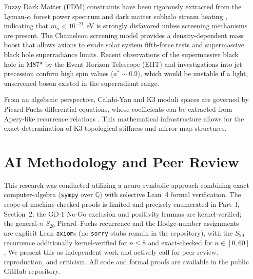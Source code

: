 \documentclass[12pt]{article}
\begin{document}
Fuzzy Dark Matter (FDM) constraints have been rigorously extracted from the Lyman-$\alpha$ forest power spectrum \cite{irsic2017, rogers2021} and dark matter subhalo stream heating \cite{webb2019}, indicating that $m_a < 10^{-21}$ eV is strongly disfavored unless screening mechanisms are present. The Chameleon screening model \cite{khoury2004chameleon, khoury2004chameleon2} provides a density-dependent mass boost that allows axions to evade solar system fifth-force tests and supermassive black hole superradiance limits. Recent observations of the supermassive black hole in M87* by the Event Horizon Telescope (EHT) \cite{eht2019first} and investigations into jet precession \cite{cui2023} confirm high spin values ($a^* \sim 0.9$), which would be unstable if a light, unscreened boson existed in the superradiant range.

From an algebraic perspective, Calabi-Yau and K3 moduli spaces are governed by Picard-Fuchs differential equations, whose coefficients can be extracted from Apery-like recurrence relations \cite{almkvist2011, zagier2009, stienstra1992}. This mathematical infrastructure allows for the exact determination of K3 topological stiffness and mirror map structures.

\section{AI Methodology and Peer Review}
This research was conducted utilizing a neuro-symbolic approach combining exact computer-algebra (\texttt{sympy} over $\mathbb{Q}$) with selective Lean~4 formal verification. The scope of machine-checked proofs is limited and precisely enumerated in Part~I, Section~2: the GD-1 No-Go exclusion and positivity lemmas are kernel-verified; the general-$n$ $S_{20}$ Picard--Fuchs recurrence and the Hodge-number assignments are explicit Lean \texttt{axiom}s (no \texttt{sorry} stubs remain in the repository), with the $S_{20}$ recurrence additionally kernel-verified for $n\le 8$ and exact-checked for $n\in[0,60]$. We present this as independent work and actively call for peer review, reproduction, and criticism. All code and formal proofs are available in the public GitHub repository.
\end{document}
